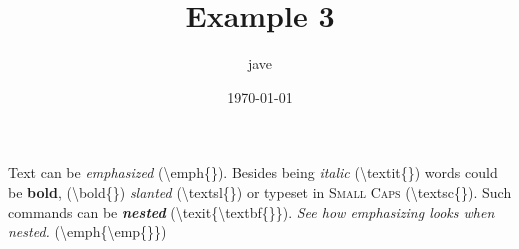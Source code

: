 \documentclass[letterpaper, 12pt]{article}
\begin{document}
\title{Example 3}
\author{jave}
\date{\today}
\maketitle

Text can be \emph{emphasized} (\textbackslash{}emph\{\}).
Besides being \textit{italic} (\textbackslash{}textit\{\}) words could be \textbf{bold}, (\textbackslash{}bold\{\})
\textsl{slanted} (\textbackslash{}textsl\{\}) or typeset in \textsc{Small Caps} (\textbackslash{}textsc\{\}).
Such commands can be \textit{\textbf{nested}} (\textbackslash{}texit\{\textbackslash{}textbf\{\}\}).
\emph{See how \emph{emphasizing} looks when nested.} (\textbackslash{}emph\{\textbackslash{}emp\{\}\})
\end{document}
